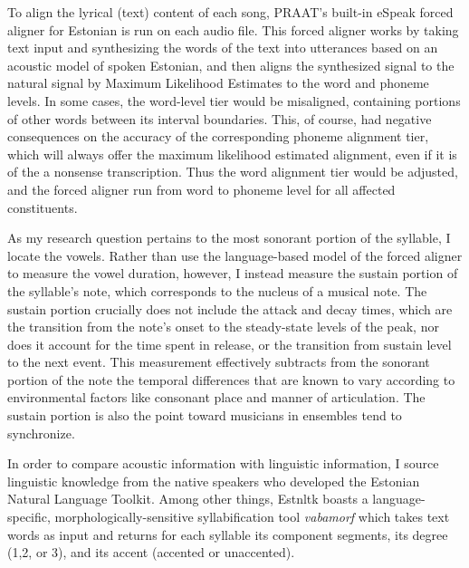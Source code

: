 To align the lyrical (text) content of each song, PRAAT's built-in eSpeak forced aligner for Estonian is run on each audio file. This forced aligner works by taking text input and synthesizing the words of the text into utterances based on an acoustic model of spoken Estonian, and then aligns the synthesized signal to the natural signal by Maximum Likelihood Estimates to the word and phoneme levels. In some cases, the word-level tier would be misaligned, containing portions of other words between its interval boundaries. This, of course, had negative consequences on the accuracy of the corresponding phoneme alignment tier, which will always offer the maximum likelihood estimated alignment, even if it is of the a nonsense transcription. Thus the word alignment tier would be adjusted, and the forced aligner run from word to phoneme level for all affected constituents. 



As my research question pertains to the most sonorant portion of the syllable, I locate the vowels. Rather than use the language-based model of the forced aligner to measure the vowel duration, however, I instead measure the sustain portion of the syllable's note, which corresponds to the nucleus of a musical note. The sustain portion crucially does not include the attack and decay times, which are the transition from the note's onset to the steady-state levels of the peak, nor does it account for the time spent in release, or the transition from sustain level to the next event. This measurement effectively subtracts from the sonorant portion of the note the temporal differences that are known to vary according to environmental factors like consonant place and manner of articulation. The sustain portion is also the point toward musicians in ensembles tend to synchronize. 



In order to compare acoustic information with linguistic information, I source linguistic knowledge from the native speakers who developed the Estonian Natural Language Toolkit. Among other things, Estnltk boasts a language-specific, morphologically-sensitive syllabification tool {\it vabamorf} which takes text words as input and returns for each syllable its component segments, its degree (1,2, or 3), and its accent (accented or unaccented). 



 
